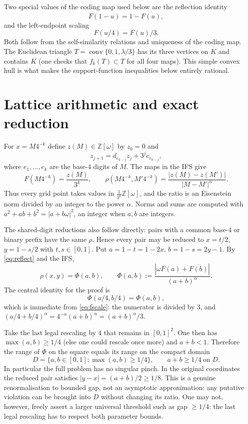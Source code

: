 \documentclass[11pt]{article}
\theoremstyle{remark}
\newcommand{\Z}{\mathbb{Z}}
\newcommand{\w}{\omega}
\begin{document}
Two special values of the coding map used below are the reflection identity
\begin{equation}\label{eq:reflect}
  F(1-u)=1-\overline{F(u)},
\end{equation}
and the left-endpoint scaling
\begin{equation}\label{eq:fscale}
  F(u/4)=F(u)/3.
\end{equation}
Both follow from the self-similarity relations and uniqueness of the coding map. The Euclidean
triangle $T=\operatorname{conv}\{0,1,\lambda/3\}$ has its three vertices on $K$ and contains
$K$ (one checks that $f_k(T)\subset T$ for all four maps). This simple convex hull is what makes the
support-function inequalities below entirely rational.

\section{Lattice arithmetic and exact reduction}
For $x=M4^{-k}$ define $z(M)\in\Z[\w]$ by $z_0=0$ and
\[
  z_{j+1}=d_{e_{k-j}}z_j+3^jc_{e_{k-j}},
\]
where $e_1,\ldots,e_k$ are the base-$4$ digits of $M$. The maps in the IFS give
\[
  F(M4^{-k})=\frac{z(M)}{3^k},\qquad
  \rho(M4^{-k},M'4^{-k})=\frac{|z(M)-z(M')|}{|M-M'|^{\alpha}}.
\]
Thus every grid point takes values in $\frac1{3^k}\Z[\w]$, and the ratio is an Eisenstein norm
divided by an integer to the power $\alpha$. Norms and sums are computed with
$a^2+ab+b^2=|a+b\w|^2$, an integer when $a,b$ are integers.

The shared-digit reductions also follow directly: pairs with a common base-$4$ or binary prefix
have the same $\rho$. Hence every pair may be reduced to $x=t/2$, $y=1-s/2$ with $t,s\in[0,1]$.
Put $a=1-t=1-2x$, $b=1-s=2y-1$. By \eqref{eq:reflect} and the IFS,
\begin{equation}\label{eq:corner}
  \rho(x,y)=\Phi(a,b),\qquad
  \Phi(a,b):=\frac{|\w F(a)+\overline{F(b)}|}{(a+b)^{\alpha}} .
\end{equation}
The central identity for the proof is
\begin{equation}\label{eq:phi-scale}
  \Phi(a/4,b/4)=\Phi(a,b),
\end{equation}
which is immediate from \eqref{eq:fscale}: the numerator is divided by $3$, and
$(a/4+b/4)^{\alpha}=4^{-\alpha}(a+b)^{\alpha}=(a+b)^{\alpha}/3$.

Take the last legal rescaling by $4$ that remains in $[0,1]^2$. One then has
$\max(a,b)\ge1/4$ (else one could rescale once more) and $a+b<1$. Therefore the range of
$\Phi$ on the square equals its range on the compact domain
\begin{equation}\label{eq:D}
  D=\{a,b\in[0,1]:\max(a,b)\ge1/4\},\qquad a+b\ge1/4\ \text{on }D.
\end{equation}
In particular the full problem has no singular pinch. In the original coordinates the reduced pair
satisfies $|y-x|=(a+b)/2\ge1/8$. This is a genuine renormalisation to bounded gap, not an
asymptotic approximation: any putative violation can be brought into $D$ without changing its
ratio. One may not, however, freely assert a larger universal threshold such as gap $\ge1/4$: the
last legal rescaling has to respect both parameter bounds.
\end{document}
